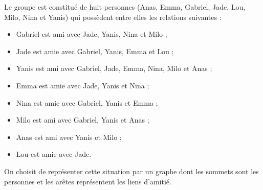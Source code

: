 \documentclass[a4paper, noanswers, addpoints, 12pt]{exam}
\begin{document}
Le groupe est constitué de huit personnes (Anas, Emma, Gabriel, Jade, Lou, Milo,
Nina et Yanis) qui possèdent entre elles les relations suivantes :
\begin{itemize}
    \item Gabriel est ami avec Jade, Yanis, Nina et Milo ;
    \item Jade est amie avec Gabriel, Yanis, Emma et Lou ;
    \item Yanis est ami avec Gabriel, Jade, Emma, Nina, Milo et Anas ;
    \item Emma est amie avec Jade, Yanis et Nina ;
    \item Nina est amie avec Gabriel, Yanis et Emma ;
    \item Milo est ami avec Gabriel, Yanis et Anas ;
    \item Anas est ami avec Yanis et Milo ;
    \item Lou est amie avec Jade.
\end{itemize}

On choisit de représenter cette situation par un graphe dont les sommets sont les personnes et les arêtes représentent les liens d'amitié.
\end{document}
